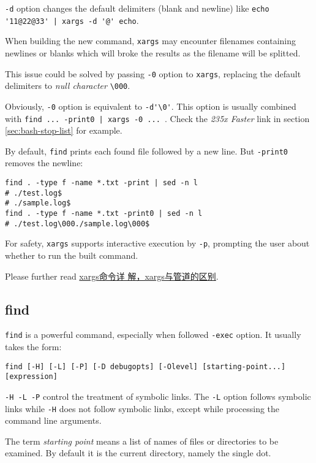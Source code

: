 \lstinline|-d| option changes the default delimiters (blank and
newline) like \lstinline/echo '11@22@33' | xargs -d '@' echo/.

When building the new command, \lstinline|xargs| may encounter
filenames containing newlines or blanks which will broke the
results as the filename will be splitted.

This issue could be solved by passing \lstinline|-0| option to
\lstinline|xargs|, replacing the default delimiters to
\textit{null character} \lstinline|\000|.

Obviously, \lstinline|-0| option is equivalent to
\lstinline|-d'\0'|. This option is usually combined with
\lstinline/find ... -print0 | xargs -0 ... /. Check the
\textit{235x Faster} link in section \ref{sec:bash-stop-list} for
example.

By default, \lstinline|find| prints each found file followed by a
new line. But \lstinline|-print0| removes the newline:

\begin{lstlisting}
find . -type f -name *.txt -print | sed -n l
# ./test.log$
# ./sample.log$
find . -type f -name *.txt -print0 | sed -n l
# ./test.log\000./sample.log\000$
\end{lstlisting}

For safety, \lstinline|xargs| supports interactive execution by
\lstinline|-p|, prompting the user about whether to run the built
command.

Please further read
\href{https://www.cnblogs.com/wangqiguo/p/6464234.html}{xargs命令详
  解，xargs与管道的区别}.

\subsection{find}
\label{sec:bash-find}

\lstinline|find| is a powerful command, especially when followed
\lstinline|-exec| option. It usually takes the form:

\begin{lstlisting}
find [-H] [-L] [-P] [-D debugopts] [-Olevel] [starting-point...] [expression]
\end{lstlisting}

\lstinline|-H -L -P| control the treatment of symbolic links. The
\lstinline|-L| option follows symbolic links while \lstinline|-H|
does not follow symbolic links, except while processing the
command line arguments.

The term \textit{starting point} means a list of names of files or
directories to be examined. By default it is the current
directory, namely the single dot.

